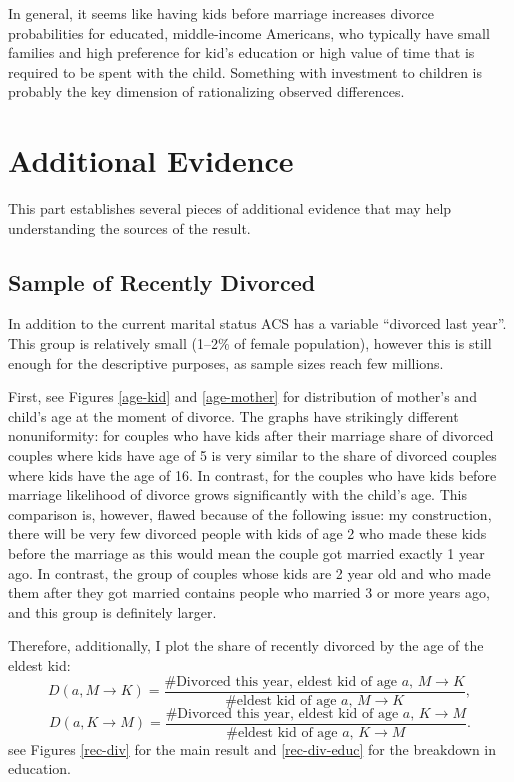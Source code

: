 \documentclass[12pt,letter]{article}
\begin{document}
In general, it seems like having kids before marriage increases divorce probabilities for educated, middle-income Americans, who typically have small families and high preference for kid's education or high value of time that is required to be spent with the child. Something with investment to children is probably the key dimension of rationalizing observed differences.


\section{Additional Evidence}
This part establishes several pieces of additional evidence that may help understanding the sources of the result. 

\subsection{Sample of Recently Divorced\label{rec-div-section}}
In addition to the current marital status ACS has a variable ``divorced last year''. This group is relatively small (1--2\% of female population), however this is still enough for the descriptive purposes, as sample sizes reach few millions.

First, see Figures \ref{age-kid} and \ref{age-mother} for distribution of mother's and child's age at the moment of divorce. The graphs have strikingly different nonuniformity: for couples who have kids after their marriage share of divorced couples where kids have age of 5 is very similar to the share of divorced couples where kids have the age of 16. In contrast, for the couples who have kids before marriage likelihood of divorce grows significantly with the child's age. This comparison is, however, flawed because of the following issue: my construction, there will be very few divorced people with kids of age 2 who made these kids before the marriage as this would mean the couple got married exactly 1 year ago. In contrast, the group of couples whose kids are 2 year old and who made them after they got married contains people who married 3 or more years ago, and this group is definitely larger.

Therefore, additionally, I plot the share of recently divorced by the age of the eldest kid:
\[D(a,M\to K) = \frac{\text{\# Divorced this year, eldest kid of age $a$, $M\to K$}}{\text{\# eldest kid of age $a$, $M\to K$}},\]
\[D(a,K\to M) = \frac{\text{\# Divorced this year, eldest kid of age $a$, $K\to M$}}{\text{\# eldest kid of age $a$, $K\to M$}}.\]
see Figures \ref{rec-div} for the main result and \ref{rec-div-educ} for the breakdown in education.
\end{document}
